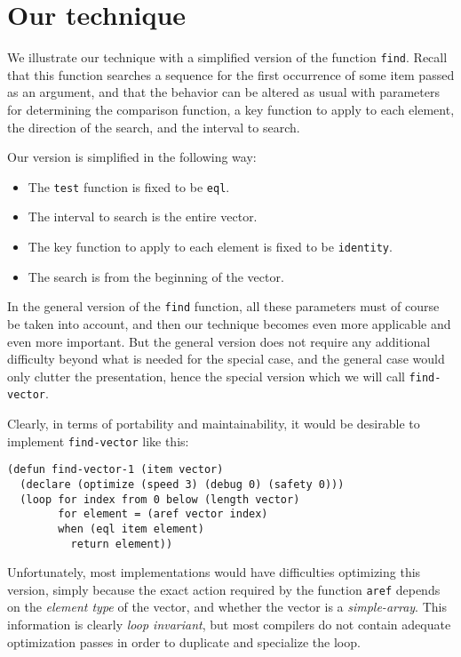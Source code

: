 \section{Our technique}

We illustrate our technique with a simplified version of the function
\texttt{find}.  Recall that this function searches a sequence for the
first occurrence of some item passed as an argument, and that the
behavior can be altered as usual with parameters for determining the
comparison function, a key function to apply to each element, the
direction of the search, and the interval to search.

Our version is simplified in the following way:

\begin{itemize}
\item The \texttt{test} function is fixed to be \texttt{eql}.
\item The interval to search is the entire vector.
\item The key function to apply to each element is fixed to be
  \texttt{identity}.
\item The search is from the beginning of the vector.
\end{itemize}

In the general version of the \texttt{find} function, all these
parameters must of course be taken into account, and then our
technique becomes even more applicable and even more important.  But
the general version does not require any additional difficulty beyond
what is needed for the special case, and the general case would only
clutter the presentation, hence the special version which we will call
\texttt{find-vector}.

Clearly, in terms of portability and maintainability, it would be
desirable to implement \texttt{find-vector} like this:

{\small\begin{verbatim}
(defun find-vector-1 (item vector)
  (declare (optimize (speed 3) (debug 0) (safety 0)))
  (loop for index from 0 below (length vector)
        for element = (aref vector index)
        when (eql item element)
          return element))
\end{verbatim}}

Unfortunately, most implementations would have difficulties optimizing
this version, simply because the exact action required by the function
\texttt{aref} depends on the \emph{element type} of the vector, and
whether the vector is a \emph{simple-array}.  This information is
clearly \emph{loop invariant}, but most compilers do not contain
adequate optimization passes in order to duplicate and specialize the
loop.

